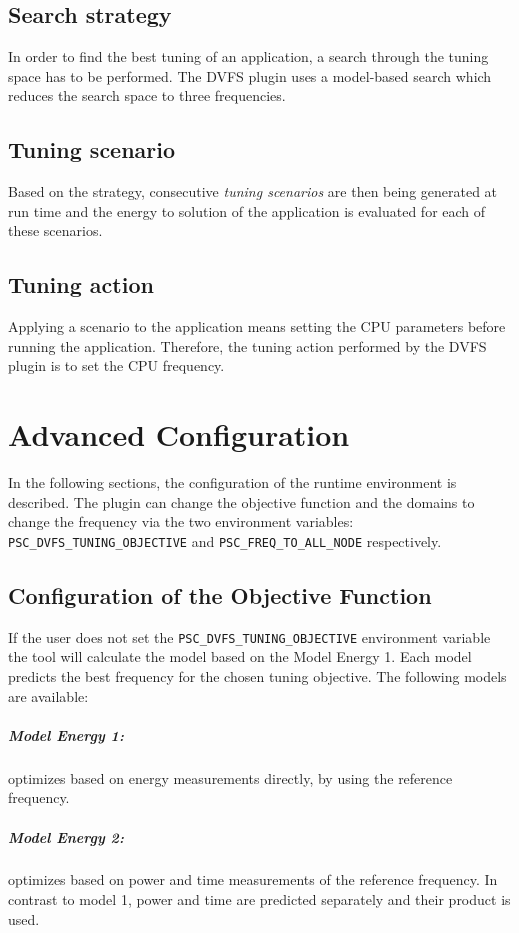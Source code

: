 \documentclass[11pt,a4paper, oneside]{book} %
\begin{document}
  \section{Search strategy}
  In order to find the best tuning of an application, a search through the tuning space has to be performed. The DVFS plugin uses a model-based search which reduces the search space to three frequencies.

  \section{Tuning scenario}
  Based on the strategy, consecutive \textit{tuning scenarios} are then being generated at run time and the energy to solution of the application is evaluated for each of these
  scenarios.

  \section{Tuning action}
  Applying a scenario to the application means setting the CPU parameters before running the application. Therefore, the tuning action performed by the DVFS plugin is to set the CPU frequency.

  \chapter{Advanced Configuration}
  In the following sections, the configuration of the runtime environment is described. The plugin can change the objective function and the domains to change the frequency via the two environment variables: \texttt{PSC\_DVFS\_TUNING\_OBJECTIVE} and \texttt{PSC\_FREQ\_TO\_ALL\_NODE} respectively.

  \section{Configuration of the Objective Function}
    If the user does not set the \texttt{PSC\_DVFS\_TUNING\_OBJECTIVE} environment variable the tool will calculate the model based on the Model Energy 1. Each model predicts the best frequency for the chosen tuning objective. The following models are available:
  \paragraph{Model Energy 1:} optimizes based on energy measurements directly, by using the reference frequency.
  \paragraph{Model Energy 2:} optimizes based on power and time measurements of the reference frequency. In contrast to model 1, power and time are predicted separately and their product is used.
\end{document}
